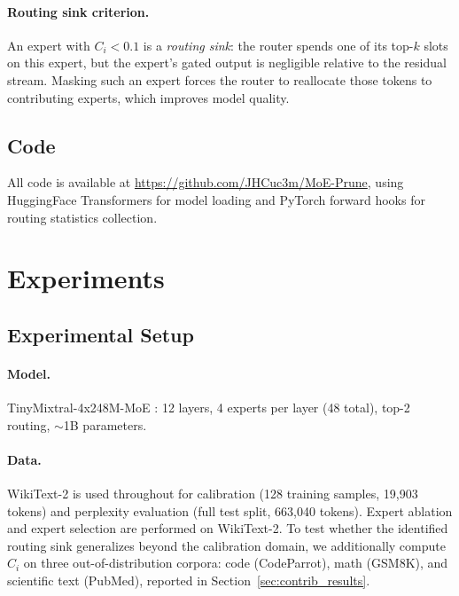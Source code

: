 \documentclass{article}
\begin{document}
\paragraph{Routing sink criterion.}
An expert with $C_i < 0.1$ is a \emph{routing sink}: the router spends one of its top-$k$ slots on this expert, but the expert's gated output is negligible relative to the residual stream. Masking such an expert forces the router to reallocate those tokens to contributing experts, which improves model quality.

\subsection{Code}

All code is available at \url{https://github.com/JHCuc3m/MoE-Prune}, using HuggingFace Transformers \citep{wolf2020transformers} for model loading and PyTorch forward hooks for routing statistics collection.

\section{Experiments}

\subsection{Experimental Setup}

\paragraph{Model.} TinyMixtral-4x248M-MoE \citep{isotonic2024}: 12 layers, 4 experts per layer (48 total), top-2 routing, $\sim$1B parameters.

\paragraph{Data.} WikiText-2 \citep{merity2017pointer} is used throughout for calibration (128 training samples, 19,903 tokens) and perplexity evaluation (full test split, 663,040 tokens). Expert ablation and expert selection are performed on WikiText-2. To test whether the identified routing sink generalizes beyond the calibration domain, we additionally compute $C_i$ on three out-of-distribution corpora: code (CodeParrot), math (GSM8K), and scientific text (PubMed), reported in Section~\ref{sec:contrib_results}.
\end{document}
